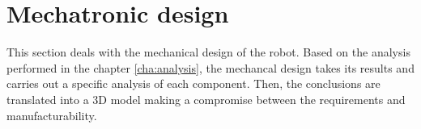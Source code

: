 \chapter{Mechatronic design} %
\label{cha:design}

This section deals with the mechanical design of the robot.
Based on the analysis performed in the chapter \ref{cha:analysis}, the mechancal design takes its results and carries out a specific analysis of each component.
Then, the conclusions are translated into a 3D model making a compromise between the requirements and manufacturability.





